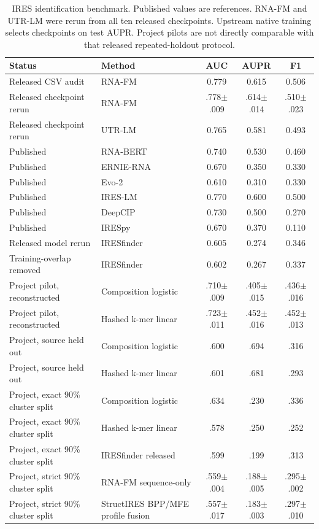 \begin{table}[t]
\centering
\caption{IRES identification benchmark. Published values are references. RNA-FM and UTR-LM were
rerun from all ten released checkpoints. Upstream native training
selects checkpoints on test AUPR. Project pilots are not directly comparable with that released
repeated-holdout protocol.}
\label{tab:prediction}
\begin{tabular}{llccc}
\toprule
Status & Method & AUC & AUPR & F1 \\
\midrule
Released CSV audit & RNA-FM & 0.779 & 0.615 & 0.506 \\
Released checkpoint rerun & RNA-FM & .778$\pm$.009 & .614$\pm$.014 & .510$\pm$.023 \\
Released checkpoint rerun & UTR-LM & 0.765 & 0.581 & 0.493 \\
Published & RNA-BERT & 0.740 & 0.530 & 0.460 \\
Published & ERNIE-RNA & 0.670 & 0.350 & 0.330 \\
Published & Evo-2 & 0.610 & 0.310 & 0.330 \\
Published & IRES-LM & 0.770 & 0.600 & 0.500 \\
Published & DeepCIP & 0.730 & 0.500 & 0.270 \\
Published & IRESpy & 0.670 & 0.370 & 0.110 \\
Released model rerun & IRESfinder & 0.605 & 0.274 & 0.346 \\
Training-overlap removed & IRESfinder & 0.602 & 0.267 & 0.337 \\
\midrule
Project pilot, reconstructed & Composition logistic & .710$\pm$.009 & .405$\pm$.015 & .436$\pm$.016 \\
Project pilot, reconstructed & Hashed k-mer linear & .723$\pm$.011 & .452$\pm$.016 & .452$\pm$.013 \\
Project, source held out & Composition logistic & .600 & .694 & .316 \\
Project, source held out & Hashed k-mer linear & .601 & .681 & .293 \\
Project, exact 90\% cluster split & Composition logistic & .634 & .230 & .336 \\
Project, exact 90\% cluster split & Hashed k-mer linear & .578 & .250 & .252 \\
Project, exact 90\% cluster split & IRESfinder released & .599 & .199 & .313 \\
Project, strict 90\% cluster split & RNA-FM sequence-only & .559$\pm$.004 & .188$\pm$.005 & .295$\pm$.002 \\
Project, strict 90\% cluster split & StructIRES BPP/MFE profile fusion & .557$\pm$.017 & .183$\pm$.003 & .297$\pm$.010 \\
\bottomrule
\end{tabular}
\end{table}
